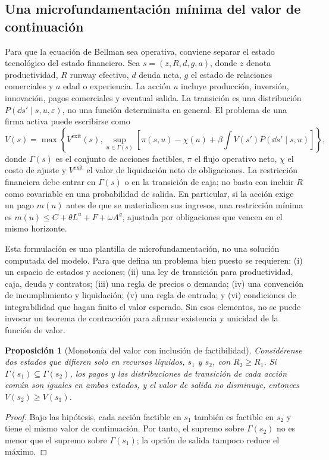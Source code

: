 \documentclass[11pt,a4paper]{article}
\newtheorem{proposition}[theorem]{Proposición}
\begin{document}
\subsection{Una microfundamentación mínima del valor de continuación}
Para que la ecuación de Bellman sea operativa, conviene separar el estado tecnológico del estado financiero. Sea $s=(z,R,d,g,a)$, donde $z$ denota productividad, $R$ runway efectivo, $d$ deuda neta, $g$ el estado de relaciones comerciales y $a$ edad o experiencia. La acción $u$ incluye producción, inversión, innovación, pagos comerciales y eventual salida. La transición es una distribución $P(\dd s'\mid s,u,\varepsilon)$, no una función determinista en general. El problema de una firma activa puede escribirse como
\begin{equation}
V(s)=\max\left\{V^{\mathrm{exit}}(s),\sup_{u\in\Gamma(s)}\left[\pi(s,u)-\chi(u)+\beta\int V(s')P(\dd s'\mid s,u)\right]\right\},
\label{eq:bellman_micro}
\end{equation}
donde $\Gamma(s)$ es el conjunto de acciones factibles, $\pi$ el flujo operativo neto, $\chi$ el costo de ajuste y $V^{\mathrm{exit}}$ el valor de liquidación neto de obligaciones. La restricción financiera debe entrar en $\Gamma(s)$ o en la transición de caja; no basta con incluir $R$ como covariable en una probabilidad de salida. En particular, si la acción exige un pago $m(u)$ antes de que se materialicen sus ingresos, una restricción mínima es $m(u)\leq C+\theta L^u+F+\omega A^g$, ajustada por obligaciones que vencen en el mismo horizonte.

Esta formulación es una plantilla de microfundamentación, no una solución computada del modelo. Para que defina un problema bien puesto se requieren: (i) un espacio de estados y acciones; (ii) una ley de transición para productividad, caja, deuda y contratos; (iii) una regla de precios o demanda; (iv) una convención de incumplimiento y liquidación; (v) una regla de entrada; y (vi) condiciones de integrabilidad que hagan finito el valor esperado. Sin esos elementos, no se puede invocar un teorema de contracción para afirmar existencia y unicidad de la función de valor.

\begin{proposition}[Monotonía del valor con inclusión de factibilidad]
Considérense dos estados que difieren solo en recursos líquidos, $s_1$ y $s_2$, con $R_2\geq R_1$. Si $\Gamma(s_1)\subseteq\Gamma(s_2)$, los pagos y las distribuciones de transición de cada acción común son iguales en ambos estados, y el valor de salida no disminuye, entonces $V(s_2)\geq V(s_1)$.
\end{proposition}
\begin{proof}
Bajo las hipótesis, cada acción factible en $s_1$ también es factible en $s_2$ y tiene el mismo valor de continuación. Por tanto, el supremo sobre $\Gamma(s_2)$ no es menor que el supremo sobre $\Gamma(s_1)$; la opción de salida tampoco reduce el máximo.\end{proof}
\end{document}
